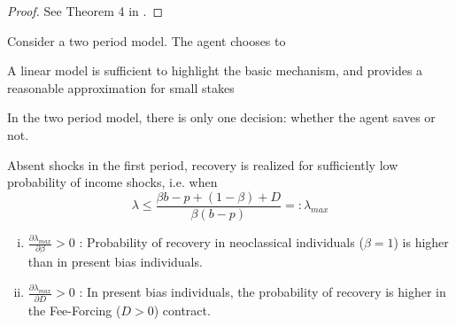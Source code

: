 \documentclass[11pt]{article}
\begin{document}
\begin{proof}
See Theorem 4 in \cite{lognormal_dominance}.
\end{proof}



Consider a two period model. The agent chooses to 

A linear model is sufficient to highlight the basic mechanism, and provides a reasonable approximation for small stakes


In the two period model, there is only one decision: whether the agent saves or not. 


\begin{prop}
Absent shocks in the first period, recovery is realized for sufficiently low probability of income shocks, i.e. when
\[\lambda\leq \frac{\beta b-p+(1-\beta)+D}{\beta(b-p)} =: \lambda_{max}\]
\end{prop}


\begin{cor}
\begin{enumerate}[(i)]
    \item $\frac{\partial \lambda_{max}}{\partial \beta}>0 $ : Probability of recovery in neoclassical individuals ($\beta = 1$) is higher than in present bias individuals.
    \item $\frac{\partial \lambda_{max}}{\partial D}>0 $ : In present bias individuals, the probability of recovery is higher in the Fee-Forcing ($D>0$) contract.  
\end{enumerate}
\end{cor}

\clearpage

%
%


\end{document}
